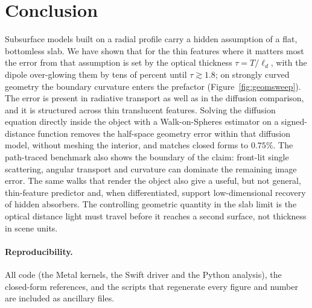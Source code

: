 \documentclass[11pt]{article}
\providecommand{\RMaxRelErr}{0.00}
\providecommand{\RTauOne}{0.0}
\renewcommand{\RMaxRelErr}{0.75}
\renewcommand{\RTauOne}{1.8}
\newcommand{\ld}{\ell_d}
\begin{document}
\section{Conclusion}
Subsurface models built on a radial profile carry a hidden assumption of a flat,
bottomless slab. We have shown that for the thin features where it matters most
the error from that assumption is set by the optical thickness
$\tau=T/\ld$, with the dipole over-glowing them by tens of percent until
$\tau\gtrsim\RTauOne$; on strongly curved geometry the boundary
curvature enters the prefactor (Figure~\ref{fig:geomsweep}). The
error is present in radiative transport as well as in the diffusion comparison,
and it is structured across thin translucent features. Solving the diffusion
equation directly inside the object with a Walk-on-Spheres estimator on a
signed-distance function removes the half-space geometry error within that
diffusion model, without meshing the interior, and matches closed forms to
$\RMaxRelErr\%$. The path-traced benchmark also shows the boundary of the claim:
front-lit single scattering, angular transport and curvature can dominate the
remaining image error. The same walks that render the object also give a useful,
but not general, thin-feature predictor and, when differentiated, support
low-dimensional recovery of hidden absorbers. The controlling geometric quantity
in the slab limit is the optical distance light must travel before it reaches a
second surface, not thickness in scene units.

\paragraph{Reproducibility.}
All code (the Metal kernels, the Swift driver and the Python analysis), the
closed-form references, and the scripts that regenerate every figure and number
are included as ancillary files.



\end{document}
